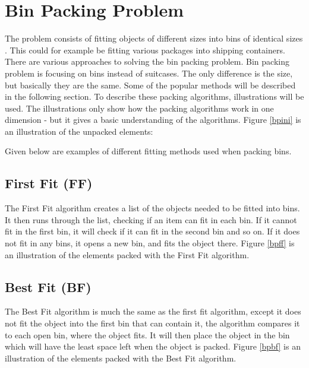 \section{Bin Packing Problem}
\label{sec:binpacking}


The problem consists of fitting objects of different sizes into bins of identical sizes \citep{appofdismath}. This could for example be fitting various packages into shipping containers. There are various approaches to solving the bin packing problem. Bin packing problem is focusing on bins instead of suitcases. The only difference is the size, but basically they are the same. Some of the popular methods will be described in the following section. To describe these packing algorithms, illustrations will be used. The illustrations only show how the packing algorithms work in one dimension - but it gives a basic understanding of the algorithms. Figure \ref{bpini} is an illustration of the unpacked elements:

Given below are examples of different fitting methods used when packing bins.

\subsection{First Fit (FF)}
The First Fit algorithm creates a list of the objects needed to be fitted into bins. It then runs through the list, checking if an item can fit in each bin. If it cannot fit in the first bin, it will check if it can fit in the second bin and so on. If it does not fit in any bins, it opens a new bin, and fits the object there. Figure \ref{bpff} is an illustration of the elements packed with the First Fit algorithm.

\subsection{Best Fit (BF)}
The Best Fit algorithm is much the same as the first fit algorithm, except it does not fit the object into the first bin that can contain it, the algorithm compares it to each open bin, where the object fits. It will then place the object in the bin which will have the least space left when the object is packed. Figure \ref{bpbf} is an illustration of the elements packed with the Best Fit algorithm.

